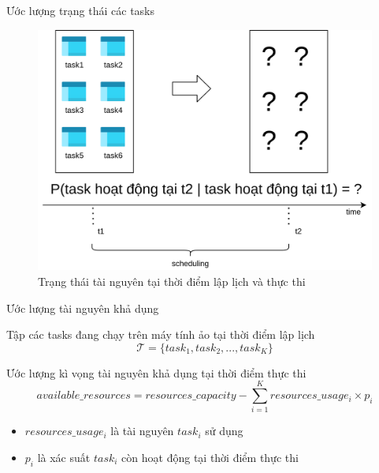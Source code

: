 \documentclass[11pt,xcolor={dvipsnames}, aspectratio=169]{beamer}
\begin{document}
\begin{frame}
{Ước lượng trạng thái các tasks}
\begin{figure}
	\centering
	\includegraphics[scale=0.5]{images/predicting_status3.png}
	\caption{Trạng thái tài nguyên tại thời điểm lập lịch và thực thi}
\end{figure}
\end{frame}

\begin{frame}
{Ước lượng tài nguyên khả dụng}
\pause
\begin{block}
{Tập các tasks đang chạy trên máy tính ảo tại thời điểm lập lịch}
\[
	\mathcal{T} = \{task_{1}, task_{2}, ..., task_{K}\}
\]
\end{block}
\begin{block}
{Ước lượng kì vọng tài nguyên khả dụng tại thời điểm thực thi}
\[
	available\_resources = resources\_capacity - \sum_{i = 1}^{K}{resources\_usage_{i} \times p_{i}}
\]
\begin{itemize}
	\item $resources\_usage_{i}$ là tài nguyên $task_{i}$ sử dụng 
	\item $p_{i}$ là xác suất $task_{i}$ còn hoạt động tại thời điểm thực thi
\end{itemize}
\end{block}
\end{frame}

\end{document}
